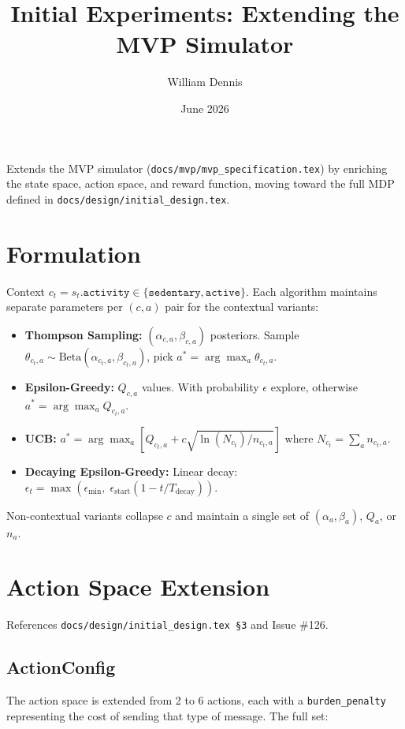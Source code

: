 \documentclass[11pt]{article}
\title{Initial Experiments: Extending the MVP Simulator}
\author{William Dennis}
\date{June 2026}
\begin{document}
\maketitle

Extends the MVP simulator (\texttt{docs/mvp/mvp\_specification.tex}) by enriching
the state space, action space, and reward function, moving toward the full
MDP defined in \texttt{docs/design/initial\_design.tex}.

\section{Formulation}
\label{sec:formulation}

Context $c_t = s_t.\texttt{activity} \in \{\texttt{sedentary}, \texttt{active}\}$. Each algorithm maintains separate parameters per $(c, a)$ pair for the contextual variants:

\begin{itemize}
  \item \textbf{Thompson Sampling:} $(\alpha_{c,a}, \beta_{c,a})$ posteriors. Sample $\theta_{c_t, a} \sim \text{Beta}(\alpha_{c_t, a}, \beta_{c_t, a})$, pick $a^* = \arg\max_a \theta_{c_t, a}$.
  \item \textbf{Epsilon-Greedy:} $Q_{c,a}$ values. With probability $\epsilon$ explore, otherwise $a^* = \arg\max_a Q_{c_t, a}$.
  \item \textbf{UCB:} $a^* = \arg\max_a \left[ Q_{c_t, a} + c \sqrt{\ln(N_{c_t}) / n_{c_t, a}} \right]$ where $N_{c_t} = \sum_a n_{c_t, a}$.
  \item \textbf{Decaying Epsilon-Greedy:} Linear decay: $\epsilon_t = \max(\epsilon_{\min},\; \epsilon_{\text{start}} (1 - t / T_{\text{decay}}))$.
\end{itemize}

Non-contextual variants collapse $c$ and maintain a single set of $(\alpha_a, \beta_a)$, $Q_a$, or $n_a$.

\section{Action Space Extension}
\label{sec:action}

References \texttt{docs/design/initial\_design.tex \S3} and Issue \#126.

\subsection{ActionConfig}
\label{sec:action-config}
The action space is extended from 2 to 6 actions, each with a \texttt{burden\_penalty} representing the cost of sending that type of message. The full set:
\end{document}
